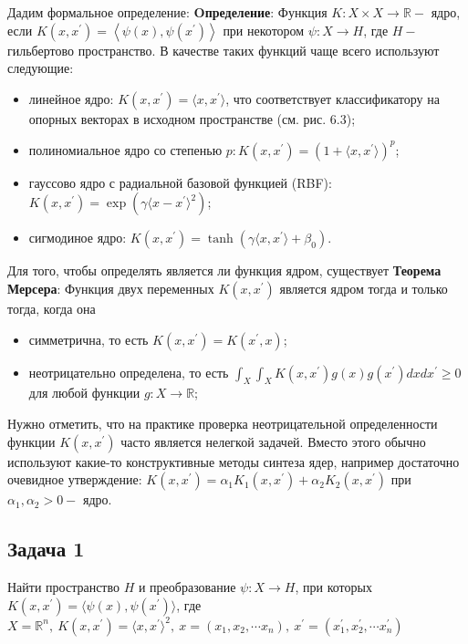 Дадим формальное определение:\newline
\textbf{Oпределение}:\newline
Функция $K: X \times X \rightarrow \mathbb{R}-$ ядро, если $K\left(x, x^{\prime}\right)=\left\langle\psi(x), \psi\left(x^{\prime}\right)\right\rangle$
при некотором $\psi: X \rightarrow H$, где $H-$ гильбертово пространство. \newline
В качестве таких функций чаще всего используют следующие:
\begin{itemize}
    \item линейное ядро: $K(x, x^{\prime})=\langle x, x^{\prime} \rangle$, что соответствует классификатору на опорных векторах в исходном пространстве (см. рис. 6.3);
    \item полиномиальное ядро со степенью $p: K(x, x^{\prime})=(1+\langle x, x^{\prime} \rangle)^p$;
    \item гауссово ядро с радиальной базовой функцией (RBF): $K(x, x^{\prime})=\exp(\gamma\langle x - x^{\prime} \rangle^2)$;
    \item сигмодиное ядро: $K(x, x^{\prime})=\tanh(\gamma\langle x, x^{\prime}\rangle+\beta_0)$.
\end{itemize}

Для того, чтобы определять является ли функция ядром, существует\newline
\textbf{Теорема Мерсера}:\newline
Функция двух переменных $K\left(x, x^{\prime}\right)$ является ядром тогда и только тогда, когда она
\begin{itemize}
    \item симметрична, то есть $K\left(x, x^{\prime}\right)=K\left(x^{\prime}, x\right)$;
    \item неотрицательно определена, то есть $\int_X \int_X K\left(x, x^{\prime}\right) g(x) g\left(x^{\prime}\right) d x d x^{\prime} \geq 0$ для любой функции $g: X \rightarrow \mathbb{R}$;
\end{itemize}

Нужно отметить, что на практике проверка неотрицательной определенности функции $K\left(x, x^{\prime}\right)$ часто является нелегкой задачей.
Вместо этого обычно используют какие-то конструктивные методы синтеза ядер, например достаточно очевидное утверждение: $K\left(x, x^{\prime}\right)=\alpha_1 K_1\left(x, x^{\prime}\right)+\alpha_2 K_2\left(x, x^{\prime}\right)$ при $\alpha_1, \alpha_2>0-$ ядро.

\subsection{Задача 1}
Найти пространство $H$ и преобразование $\psi: X \rightarrow H$, при которых
$K(x, x^{\prime}) = \langle \psi(x),\psi(x^{\prime}) \rangle $, где $X = \mathbb{R}^n,~
    K(x, x^{\prime}) = \langle x, x^{\prime} \rangle^2,~ x = (x_1, x_2, \cdots x_n),~ x^{\prime} = (x_1^{\prime}, x_2^{\prime}, \cdots x_n^{\prime})$
